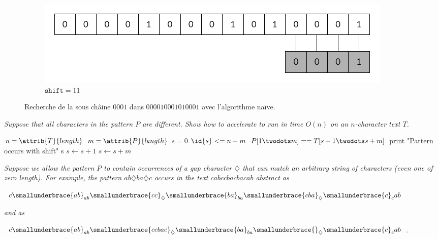 \begin{description}
\begin{ex}
\begin{figure}[H]
\begin{subfigure}[t]{.45\textwidth}
        \centering
        \includegraphics[scale=.6]{img/32_1-1/32_1-1_12.pdf}
        \caption{$\texttt{shift} = 11$}\label{fig:32_1-1_12}
      \end{subfigure}
      \caption{Recherche de la sous châine $0001$ dans $000010001010001$ avec l'algorithme naïve.} 
      \label{fig:naive-match-string} 
    \end{figure}
\end{ex}


 \textit{Suppose that all characters in the pattern $P$ are different. Show how to accelerate
 to run in time $O(n)$ on an $n$-character text $T$.}

\begin{ex}
\begin{codebox}
    \li $n = \attrib{T}{length}$
    \li $m = \attrib{P}{length}$
    \li $s = 0$
    \li \While $\id{s} <= n -m$ \Do
    \li \If $P[1\twodots m] == T[s + 1\twodots s + m]$ \Then
    \li print "Pattern occurs with shift" s 
    \li $s \gets s + 1$ 
    \li \Else 
    \li $s \gets s + m$ \End
\end{codebox}
\end{ex}

 \textit{}
 \textit{Suppose we allow the pattern $P$ to contain occurrences of a gap character $\diamondsuit$ that
can match an \textit{arbitrary} string of characters (even one of zero length). For example,
the pattern $ab\diamondsuit ba\diamondsuit c$ occurs in the text $cabccbacbacab$ abstract as}

    $c\smallunderbrace{ab}_{ab}\smallunderbrace{cc}_{\diamondsuit}\smallunderbrace{ba}_{ba}\smallunderbrace{cba}_{\diamondsuit}\smallunderbrace{c}_{c}ab$

\textit{and as}

    $c\smallunderbrace{ab}_{ab}\smallunderbrace{ccbac}_{\diamondsuit}\smallunderbrace{ba}_{ba}\smallunderbrace{}_{\diamondsuit}\smallunderbrace{c}_{c}ab$.

\begin{ex}


\end{ex}
\end{description}
